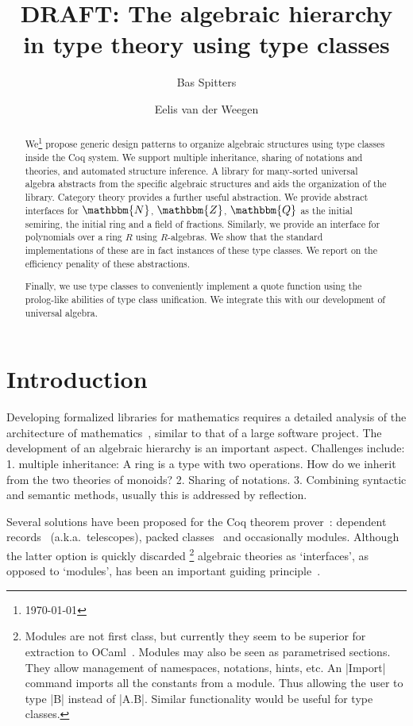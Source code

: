 \documentclass[a4paper,10pt,runningheads]{llncs}
\newcommand{\N}{\ensuremath{\mathbbm{N}}}
\newcommand{\Z}{\ensuremath{\mathbbm{Z}}}
\newcommand{\Q}{\ensuremath{\mathbbm{Q}}}
\begin{document}
\title{DRAFT: The algebraic hierarchy in type theory using type classes}
\author{Bas Spitters \and Eelis van der Weegen}
\maketitle
\begin{abstract}
We\footnote{\today} propose generic design patterns to organize algebraic structures using
type classes inside the
Coq system. We support multiple inheritance, sharing of notations and theories, and automated
structure inference. A library for many-sorted universal algebra abstracts from the specific
algebraic structures and aids the organization of the library. Category theory provides a further
useful abstraction. We provide abstract
interfaces for $\N$, $\Z$, $\Q$ as the initial semiring, the initial ring and a field of
fractions. Similarly, we provide an interface for polynomials over a ring $R$ using $R$-algebras.
We show that the standard implementations of these are in fact instances of these type classes.
We report on the efficiency penality of these abstractions.

Finally, we use type classes to conveniently implement a quote function using the prolog-like
abilities of type class unification. We integrate this with our development of universal algebra.
\end{abstract}

\section{Introduction}
Developing formalized libraries for mathematics requires a detailed analysis of the
architecture of mathematics~\cite{C-corn,DBLP:conf/types/HaftmannW08}, similar to that of a large
software project.
The development of an algebraic hierarchy is an important aspect. Challenges include: 1. multiple
inheritance: A ring is a type with two operations. How do we inherit from the two theories of
monoids? 2. Sharing of notations. 3. Combining syntactic and semantic methods, usually this is
addressed by reflection.

Several solutions have been proposed for the Coq theorem prover~\cite{Coq,BC04}: dependent
records~\cite{DBLP:journals/jsc/GeuversPWZ02} (a.k.a.\ telescopes), packed classes~\cite{Packed} and
occasionally modules. Although the latter option is quickly discarded%
\footnote{Modules are not first class, but currently they seem to be superior for extraction to
OCaml~\cite{letouzey02}. Modules may also be seen as parametrised sections. They allow management
of namespaces, notations, hints, etc. An |Import| command imports all the constants from a
module. Thus allowing the user to type |B| instead of |A.B|. Similar functionality would be useful
for type classes.}
algebraic theories as `interfaces', as opposed to `modules', has been an important
guiding principle~\cite{Packed}.
\end{document}
